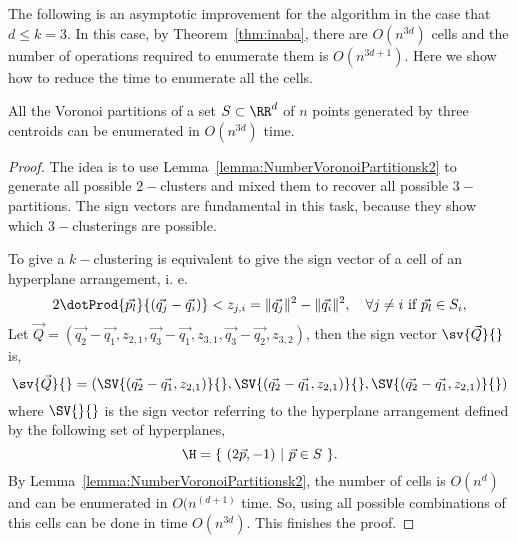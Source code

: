 The following is an asymptotic improvement for the algorithm in the case that 
$d\le k=3$. In this case, by Theorem~\ref{thm:inaba}, there are 
$O(n^{3d})$ cells and the number of operations required to enumerate them 
is $O(n^{3d+1})$. Here we show how to reduce the time to enumerate all the cells.
\begin{lemma}
  All the Voronoi partitions of a set $S\subset\RR^d$ of $n$ points generated 
  by three centroids can be enumerated in $O(n^{3d})$ time.
\end{lemma}
\begin{proof}
  The idea is to use Lemma~\ref{lemma:NumberVoronoiPartitionsk2} to generate all
  possible $2-$clusters and  mixed them to recover all possible $3-$partitions.
  The sign vectors are fundamental in this task, because they show which 
  $3-$clusterings are possible.

  To give a $k-$clustering is equivalent to give the sign vector of a cell of an 
  hyperplane arrangement, i. e. 
  \begin{equation*}
    2\dotProd{\vec{p_l}}{(\vec{q_j}-\vec{q_i})}< z_{j,i}
    =\|\vec{q_j}\|^2-\|\vec{q_i}\|^2,\quad \forall j\neq i\text{ if }\vec{p_l}\in S_i, 
  \end{equation*}
  Let $\vec{Q}=(\vec{q_2}-\vec{q_1},z_{2,1},
  \vec{q_3}-\vec{q_1},z_{3,1},\vec{q_3}-\vec{q_2},z_{3,2})$, then the 
  sign vector $    \sv{\vec{Q}}{}$ is,
  \begin{equation*}
    \sv{\vec{Q}}{}=(\SV{(\vec{q_2}-\vec{q_1},z_{2,1})}{},
    \SV{(\vec{q_2}-\vec{q_1},z_{2,1})}{},\SV{(\vec{q_2}-\vec{q_1},z_{2,1})}{})
  \end{equation*}
  where $\SV{}{}$ is the sign vector referring to the hyperplane arrangement
  defined by the following set of hyperplanes,
  \begin{equation*}
    \H=\{\ (2\vec{p},-1)\ |\ \vec{p}\in S\ \}.
  \end{equation*}
  By Lemma~\ref{lemma:NumberVoronoiPartitionsk2}, the number of cells is $O(n^d)$ and 
  can be enumerated in $O(n^{(d+1)}$ time. So, using all possible combinations
  of this cells can be done in time $O(n^{3d})$. This finishes the proof.
\end{proof}
